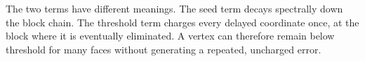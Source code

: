 The two terms have different meanings.  The seed term decays spectrally down
the block chain.  The threshold term charges every delayed coordinate once,
at the block where it is eventually eliminated.  A vertex can therefore
remain below threshold for many faces without generating a repeated,
uncharged error.
